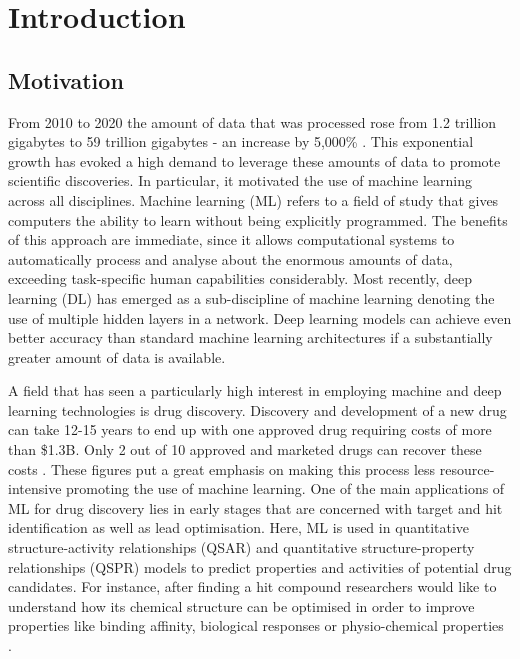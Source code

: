 \section{Introduction}
\subsection{Motivation}
From 2010 to 2020 the amount of data that was processed rose from 1.2 trillion gigabytes to 59 trillion gigabytes - an increase by 5,000\% \citep{data}. This exponential growth has evoked a high demand to leverage these amounts of data to promote scientific discoveries. In particular, it motivated the use of machine learning across all disciplines. Machine learning (ML) refers to a field of study that gives computers the ability to learn without being explicitly programmed. The benefits of this approach are immediate, since it allows computational systems to automatically process and analyse about the enormous amounts of data, exceeding task-specific human capabilities considerably. 
Most recently, deep learning (DL) has emerged as a sub-discipline of machine learning denoting the use of multiple hidden layers in a network. Deep learning models can achieve even better accuracy than standard machine learning architectures if a substantially greater amount of data is available.

A field that has seen a particularly high interest in employing machine and deep learning technologies is drug discovery. Discovery and development of a new drug can take 12-15 years to end up with one approved drug requiring costs of more than \$1.3B. Only 2 out of 10 approved and marketed drugs can recover these costs \citep{hecht}. These figures put a great emphasis on making this process less resource-intensive promoting the use of machine learning. One of the main applications of ML for drug discovery lies in early stages that are concerned with target and hit identification as well as lead optimisation. Here, ML is used in  quantitative structure-activity relationships (QSAR) and quantitative structure-property relationships (QSPR) models to predict properties and activities of potential drug candidates. For instance, after finding a hit compound researchers would like to understand how its chemical structure can be optimised in order to improve properties like binding affinity, biological responses or physio-chemical properties \citep{LO20181538}. 

